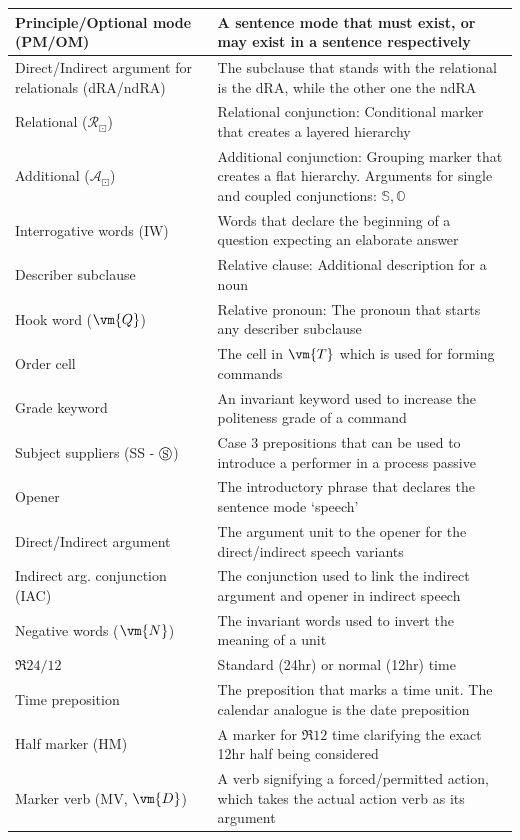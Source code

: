 \begin{center}
\begin{tabular}{m{5cm} m{10cm}}
    Principle/Optional mode (PM/OM) & A sentence mode that must exist, or may exist in a sentence respectively\\\hline
    Direct/Indirect argument for  relationals (dRA/ndRA) & The subclause that stands with the relational is the dRA, while the other one the ndRA\\\hline
    Relational ($\mathcal{R}_\boxdot$) & Relational conjunction:   Conditional marker that creates a layered hierarchy\\\hline
    Additional ($\mathcal{A}_\boxdot$) & Additional conjunction: Grouping marker that creates a flat hierarchy. Arguments for single and coupled conjunctions: $\mathbb{S}, \mathbb{O}$\\\hline
    Interrogative words (IW)& Words that declare the beginning of a question expecting an elaborate answer\\\hline
    Describer subclause & Relative clause: Additional description for a noun \\\hline
    Hook word ($\vm{Q}$) & Relative pronoun: The pronoun that starts any describer subclause\\\hline
    Order cell & The cell in $\vm{T}$ which is used for forming commands\\\hline
    Grade keyword & An invariant keyword used to increase the politeness grade of a command\\\hline
    Subject suppliers (SS - $\circledS$) & Case $3$ prepositions that can be used to introduce a performer in a process passive\\\hline
    Opener & The introductory phrase that declares the sentence mode `speech'\\\hline
    Direct/Indirect argument & The argument unit to the opener for the direct/indirect speech variants\\\hline
    Indirect arg. conjunction (IAC) & The conjunction used to link the indirect argument and opener in  indirect speech\\\hline
    Negative words ($\vm{N}$) & The invariant words used to invert the meaning of a unit\\\hline
    $\mathfrak{R}24/12$ & Standard (24hr) or normal (12hr) time\\\hline
    Time preposition & The preposition that  marks a time unit. The calendar analogue is the date preposition\\\hline
    Half marker (HM) & A marker for $\mathfrak{R}12$ time clarifying the exact 12hr half being considered\\\hline
    Marker verb (MV, $\vm{D}$) & A verb  signifying a forced/permitted action, which takes the actual action verb as its argument\\\hline
\end{tabular}
\end{center}


